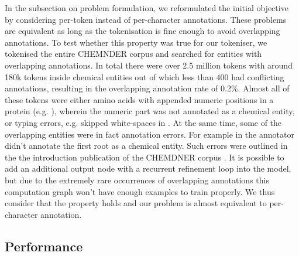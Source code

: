 \documentclass[twocolumn]{bmcart}%
\begin{document}
In the subsection on problem formulation, we reformulated the initial objective by considering per-token instead of per-character annotations.
These problems are equivalent as long as the tokenisation is fine enough to avoid overlapping annotations.
To test whether this property was true for our tokeniser, we tokenised the entire CHEMNDER corpus and searched for entities with overlapping annotations.
In total there were over 2.5 million tokens with around 180k tokens inside chemical entities out of which less than 400 had conflicting annotations, resulting in the overlapping annotation rate of 0.2\%.
Almost all of these tokens were either amino acids with appended numeric positions in a protein (e.g. ), wherein the numeric part was not annotated as a chemical entity, or typing errors, e.g. skipped white-spaces in .
At the same time, some of the overlapping entities were in fact annotation errors.
For example in  the annotator didn't annotate the first root as a chemical entity.
Such errors were outlined in the the introduction publication of the CHEMDNER corpus \cite{Krallinger2015}.
It is possible to add an additional output node with a recurrent refinement loop into the model, but due to the extremely rare occurrences of overlapping annotations this computation graph won't have enough examples to train properly.
We thus consider that the property holds and our problem is almost equivalent to per-character annotation.

\subsection*{Performance}
\end{document}
